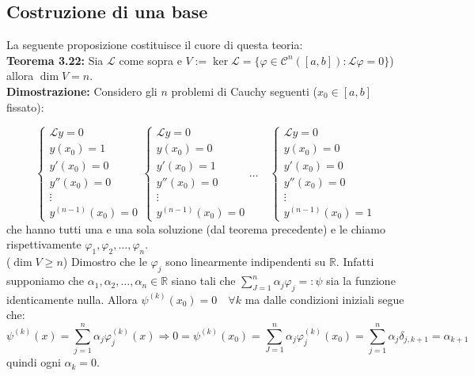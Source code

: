 \documentclass[a4paper,11pt,titlepage]{book}
\begin{document}
\subsection{Costruzione di una base}

La seguente proposizione costituisce il cuore di questa teoria:\\

\textbf{Teorema 3.22:} Sia $\mathcal{L}$ come sopra e $V:=\ker\mathcal{L}=\{\varphi\in\mathcal{C}^n([a,b]): \mathcal{L}\varphi=0\}$) allora $\dim V=n$.\\

\textbf{Dimostrazione: }Considero gli $n$ problemi di Cauchy seguenti ($x_0\in[a,b]$ fissato):

$$\begin{cases}
\mathcal{L}y=0\\
y(x_0)=1\\
y'(x_0)=0\\
y''(x_0)=0\\
\vdots \\
y^{(n-1)}(x_0)=0
\end{cases}
\begin{cases}
\mathcal{L}y=0\\
y(x_0)=0\\
y'(x_0)=1\\
y''(x_0)=0\\
\vdots \\
y^{(n-1)}(x_0)=0
\end{cases}
\ldots\quad
\begin{cases}
\mathcal{L}y=0\\
y(x_0)=0\\
y'(x_0)=0\\
y''(x_0)=0\\
\vdots \\
y^{(n-1)}(x_0)=1
\end{cases}$$
che hanno tutti una e una sola soluzione (dal teorema precedente) e le chiamo rispettivamente $\varphi_1,\varphi_2,\ldots,\varphi_n$.\\

($\dim V\geq n$) Dimostro che le $\varphi_j$ sono linearmente indipendenti su $\mathbb{R}$. Infatti supponiamo che $\alpha_1,\alpha_2,\ldots,\alpha_n\in\mathbb{R}$ siano tali che $\sum_{J=1}^n\alpha_j\varphi_j=:\psi$ sia la funzione identicamente nulla. Allora $\psi^{(k)}(x_0)=0\quad\forall k$ ma dalle condizioni iniziali segue che:
$$\psi^{(k)}(x)=\sum_{j=1}^n\alpha_j\varphi_j^{(k)}(x)\Rightarrow 0=\psi^{(k)}(x_0)=\sum_{J=1}^n\alpha_j\varphi_j^{(k)}(x_0)=\sum_{j=1}^n\alpha_j\delta_{j,k+1}=\alpha_{k+1}$$
quindi ogni $\alpha_k=0$.\\
\end{document}
